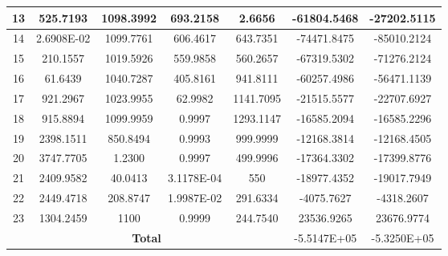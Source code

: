\begin{table}
{\begin{tabular}{|c|c|c|c|c|c|c|}
		\hline
		13   & 525.7193   & 1098.3992  & 693.2158   & 2.6656     & -61804.5468   & -27202.5115     \\ 
		\hline
		14   & 2.6908E-02 & 1099.7761  & 606.4617   & 643.7351   & -74471.8475   & -85010.2124     \\ 
		\hline
		15   & 210.1557   & 1019.5926  & 559.9858   & 560.2657   & -67319.5302   & -71276.2124     \\ 
		\hline
		16   & 61.6439    & 1040.7287  & 405.8161   & 941.8111   & -60257.4986   & -56471.1139     \\ 
		\hline
		17   & 921.2967   & 1023.9955  & 62.9982    & 1141.7095  & -21515.5577   & -22707.6927     \\ 
		\hline
		18   & 915.8894   & 1099.9959  & 0.9997     & 1293.1147  & -16585.2094   & -16585.2296     \\ 
		\hline
		19   & 2398.1511  & 850.8494   & 0.9993     & 999.9999   & -12168.3814   & -12168.4505     \\ 
		\hline
		20   & 3747.7705  & 1.2300     & 0.9997     & 499.9996   & -17364.3302   & -17399.8776     \\ 
		\hline
		21   & 2409.9582  & 40.0413    & 3.1178E-04 & 550        & -18977.4352   & -19017.7949     \\ 
		\hline
		22   & 2449.4718  & 208.8747   & 1.9987E-02 & 291.6334   & -4075.7627    & -4318.2607      \\ 
		\hline
		23   & 1304.2459  & 1100       & 0.9999     & 244.7540   & 23536.9265    & 23676.9774      \\ 
		\hline
		\multicolumn{5}{|c|}{\textbf{Total}}                              & -5.5147E+05   & -5.3250E+05     \\
		\hline
	\end{tabular}
}
\end{table}

